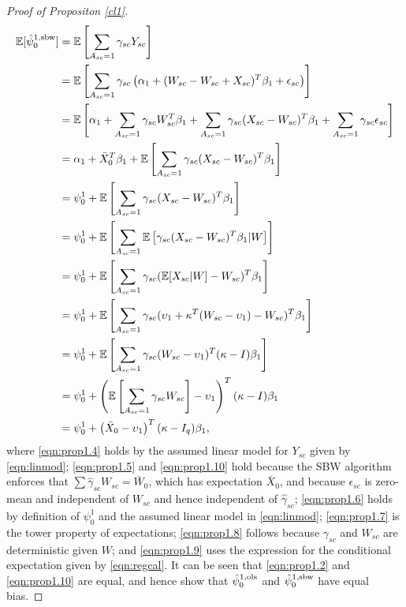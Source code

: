 \begin{proof}[Proof of Propositon \ref{cl1}]
\begin{align}
\nonumber	\mathbb{E}[\hat{\psi}_0^{1, \textup{sbw}}] & = \mathbb{E}\left[ \sum_{A_{sc} = 1} {\gamma}_{sc} Y_{sc}\right] \\
	& = \mathbb{E}\left[ \sum_{A_{sc}=1} {\gamma}_{sc} \left(\alpha_1 + (W_{sc} - W_{sc} + X_{sc})^T \beta_1 + \epsilon_{sc}\right)\right] \label{eqn:prop1.4}\\
\nonumber	& = \mathbb{E}\left[ \alpha_1 + \sum_{A_{sc} = 1} {\gamma}_{sc} W_{sc}^T \beta_1 + \sum_{A_{sc}=1} {\gamma}_{sc} (X_{sc} - W_{sc})^T \beta_1 + \sum_{A_{sc}=1} {\gamma}_{sc} \epsilon_{sc} \right] \\
	& = \alpha_1 + \bar{X}_0^T\beta_1 + \mathbb{E}\left[ \sum_{A_{sc} = 1} {\gamma}_{sc}(X_{sc} - W_{sc})^T \beta_1\right] \label{eqn:prop1.5}\\
	& = \psi_0^1 + \mathbb{E} \left[ \sum_{A_{sc} = 1} {\gamma}_{sc}(X_{sc} - W_{sc})^T \beta_1 \right] \label{eqn:prop1.6} \\
	& = \psi_0^1 + \mathbb{E} \left[ \sum_{A_{sc} = 1} \mathbb{E}\left[ {\gamma}_{sc}(X_{sc} - W_{sc})^T \beta_1 | W \right] \right] \label{eqn:prop1.7} \\
	& = \psi_0^1 + \mathbb{E} \left[ \sum_{A_{sc} = 1}  {\gamma}_{sc} (\mathbb{E}[X_{sc}|W] - W_{sc})^T \beta_1 \right] \label{eqn:prop1.8} \\
	& = \psi_0^1 + \mathbb{E} \left[ \sum_{A_{sc} = 1}  {\gamma}_{sc} (\upsilon_1 + \kappa^T(W_{sc} - \upsilon_1) - W_{sc})^T \beta_1 \right] \label{eqn:prop1.9} \\
\nonumber	& = \psi_0^1 + \mathbb{E} \left[ \sum_{A_{sc} = 1}  {\gamma}_{sc} (W_{sc} - \upsilon_1)^T(\kappa - I)\beta_1 \right] \\
\nonumber	& = \psi_0^1 + \left(\mathbb{E}\left[\sum_{A_{sc} = 1} {\gamma}_{sc} W_{sc}\right] - \upsilon_1\right)^T(\kappa - I)\beta_1  \\
	& = \psi_0^1 + \left(\bar{X}_0 - \upsilon_1\right)^T(\kappa - I_q)\beta_1,  \label{eqn:prop1.10}
\end{align}
%
where \eqref{eqn:prop1.4} holds by the assumed linear model for $Y_{sc}$ given by  \eqref{eqn:linmod}; \eqref{eqn:prop1.5} and \eqref{eqn:prop1.10} hold because the SBW algorithm enforces that $\sum \hat{\gamma}_{sc} W_{sc} = \bar{W}_0$, which has expectation $\bar{X}_0$, and because $\epsilon_{sc}$ is zero-mean and independent of $W_{sc}$ and hence independent of $\hat{\gamma}_{sc}$; \eqref{eqn:prop1.6} holds by definition of $\psi_0^1$ and the assumed linear model in \eqref{eqn:linmod}; \eqref{eqn:prop1.7} is the tower property of expectations; \eqref{eqn:prop1.8} follows because $\gamma_{sc}$ and $W_{sc}$ are deterministic given $W$; and \eqref{eqn:prop1.9} uses the expression for the conditional expectation given by \eqref{eqn:regcal}. It can be seen that \eqref{eqn:prop1.2} and \eqref{eqn:prop1.10} are equal, and hence show that $\hat{\psi}_0^{1,\textup{ols}}$ and $\hat{\psi}_0^{1, \textup{sbw}}$ have equal bias.


\end{proof}
